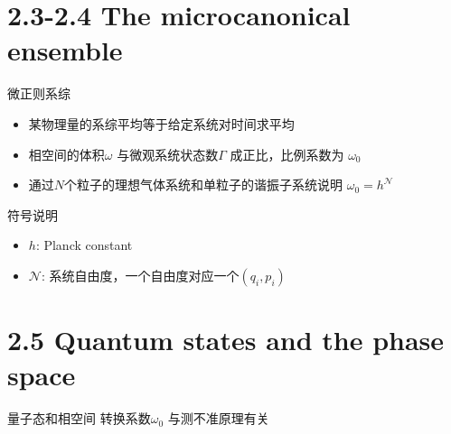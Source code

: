 \documentclass{ctexbeamer}
\begin{document}
\section{2.3-2.4 The microcanonical ensemble}
\begin{frame}{微正则系综}
    \begin{itemize}
        \item 某物理量的系综平均等于给定系统对时间求平均
        \item 相空间的体积$\omega$
        与微观系统状态数$\Gamma$
        成正比，比例系数为 $\omega_0$
        \item 通过$N$个粒子的理想气体系统和单粒子的谐振子系统说明 $\omega_0=h^{\mathcal{N}}$
    \end{itemize}
    \begin{block}{符号说明}
    \begin{itemize}
        \item $h$: Planck constant
        \item $\mathcal{N}$: 系统自由度，一个自由度对应一个$(q_i, p_i)$
    \end{itemize}
    \end{block}
\end{frame}
\section{2.5 Quantum states and the phase space}
\begin{frame}{量子态和相空间}
    转换系数$\omega_0$ 与测不准原理有关
\end{frame}
\end{document}
